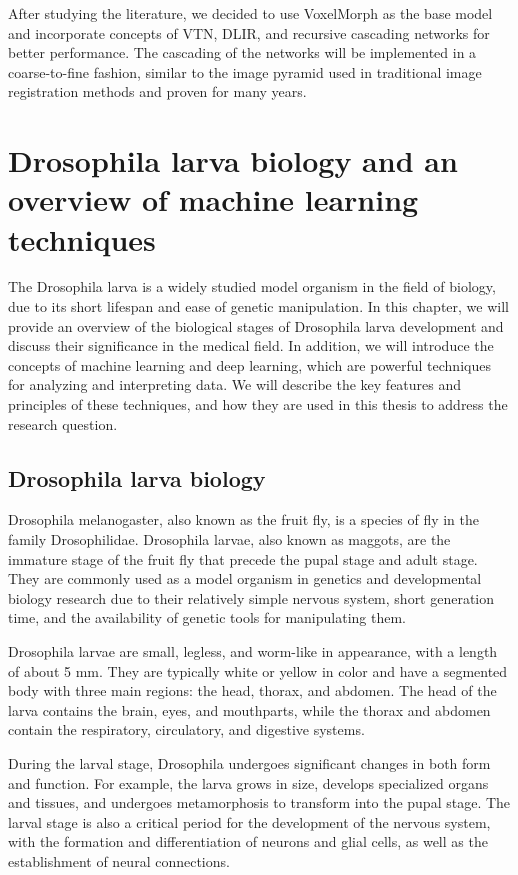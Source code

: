 \documentclass{report}
\begin{document}
	
	After studying the literature, we decided to use VoxelMorph as the base model and incorporate concepts of VTN, DLIR, and recursive cascading networks for better performance. The cascading of the networks will be implemented in a coarse-to-fine fashion, similar to the image pyramid used in traditional image registration methods and proven for many years.
	
	
	\chapter{Drosophila larva biology and an overview of machine learning techniques}
	The Drosophila larva is a widely studied model organism in the field of biology, due to its short lifespan and ease of genetic manipulation. In this chapter, we will provide an overview of the biological stages of Drosophila larva development and discuss their significance in the medical field. In addition, we will introduce the concepts of machine learning and deep learning, which are powerful techniques for analyzing and interpreting data. We will describe the key features and principles of these techniques, and how they are used in this thesis to address the research question.
	
	\section{Drosophila larva biology}
	Drosophila melanogaster, also known as the fruit fly, is a species of fly in the family Drosophilidae. Drosophila larvae, also known as maggots, are the immature stage of the fruit fly that precede the pupal stage and adult stage. They are commonly used as a model organism in genetics and developmental biology research due to their relatively simple nervous system, short generation time, and the availability of genetic tools for manipulating them.
	
	Drosophila larvae are small, legless, and worm-like in appearance, with a length of about 5 mm. They are typically white or yellow in color and have a segmented body with three main regions: the head, thorax, and abdomen. The head of the larva contains the brain, eyes, and mouthparts, while the thorax and abdomen contain the respiratory, circulatory, and digestive systems.
	
	During the larval stage, Drosophila undergoes significant changes in both form and function. For example, the larva grows in size, develops specialized organs and tissues, and undergoes metamorphosis to transform into the pupal stage. The larval stage is also a critical period for the development of the nervous system, with the formation and differentiation of neurons and glial cells, as well as the establishment of neural connections.
	
\end{document}
